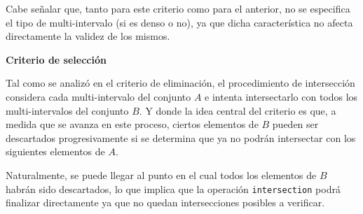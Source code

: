 \begin{center}
\end{center}

Cabe señalar que, tanto para este criterio como para el anterior, no se especifica el tipo de multi-intervalo (si es denso o no), ya que dicha característica no afecta directamente la validez de los mismos.


{\bf Criterio de selección}

Tal como se analizó en el criterio de eliminación, el procedimiento de intersección considera cada multi-intervalo del conjunto $A$ e intenta intersectarlo con todos los multi-intervalos del conjunto $B$. Y donde la idea central del criterio es que, a medida que se avanza en este proceso, ciertos elementos de $B$ pueden ser descartados progresivamente si se determina que ya no podrán intersectar con los siguientes elementos de $A$.

Naturalmente, se puede llegar al punto en el cual todos los elementos de $B$ habrán sido descartados, lo que implica que la operación \texttt{intersection} podrá finalizar directamente ya que no quedan intersecciones posibles a verificar.

